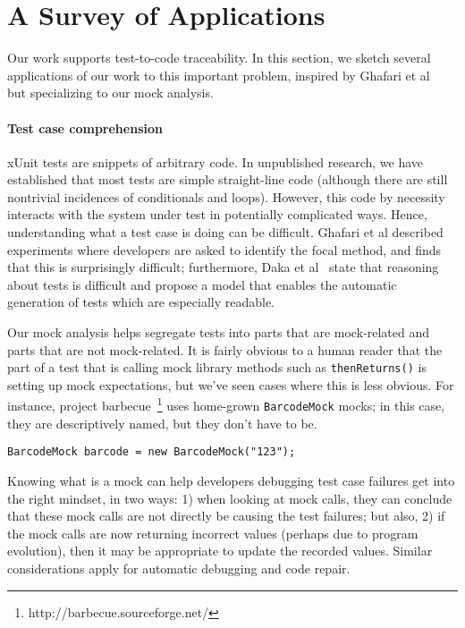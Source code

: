 \section{A Survey of Applications}
\label{sec:applications}

Our work supports test-to-code traceability. In this section, we
sketch several applications of our work to this important problem,
inspired by Ghafari et al~\cite{ghafari15:_autom} but specializing to
our mock analysis.

\paragraph{Test case comprehension} xUnit tests are snippets of arbitrary
code. In unpublished research, we have established that most tests are
simple straight-line code (although there are still nontrivial incidences of
conditionals and loops). However, this code by necessity interacts with
the system under test in potentially complicated ways. Hence,
understanding what a test case is doing can be difficult. Ghafari et
al described experiments where developers are asked to identify the
focal method, and finds that this is surprisingly difficult;
furthermore, Daka et al~\cite{daka15:_model_readab_improv_unit_tests}
state that reasoning about tests is difficult and propose a model that
enables the automatic generation of tests which are especially
readable.

Our mock analysis helps segregate tests into parts that are
mock-related and parts that are not mock-related.  It is fairly
obvious to a human reader that the part of a test that is calling mock
library methods such as \texttt{thenReturns()} is setting up mock
expectations, but we've seen cases where this is less
obvious. For instance, project barbecue~\footnote{http://barbecue.sourceforge.net/} uses home-grown \texttt{BarcodeMock} mocks; in this case, they are descriptively named,
but they don't have to be.

\begin{lstlisting}[basicstyle=\ttfamily\small,numbers=none]
BarcodeMock barcode = new BarcodeMock("123");
\end{lstlisting}


Knowing what is a mock can help developers debugging test case
failures get into the right mindset, in two ways: 1) when looking at
mock calls, they can conclude that these mock calls are not
directly be causing the test failures; but also, 2) if the mock calls
are now returning incorrect values (perhaps due to program evolution),
then it may be appropriate to update the recorded values. Similar considerations
apply for automatic debugging and code repair.

